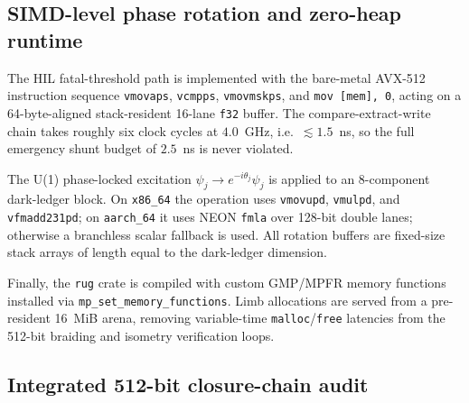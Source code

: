 \documentclass[aps,pra,10pt,onecolumn,superscriptaddress,nofootinbib,longbibliography,floatfix]{revtex4-2}
\begin{document}
\subsection{SIMD-level phase rotation and zero-heap runtime}

\begin{sloppypar}
The HIL fatal-threshold path is implemented with the bare-metal AVX-512 instruction sequence \texttt{vmovaps}, \texttt{vcmpps}, \texttt{vmovmskps}, and \texttt{mov [mem], 0}, acting on a 64-byte-aligned stack-resident 16-lane \texttt{f32} buffer.  The compare-extract-write chain takes roughly six clock cycles at $4.0$~GHz, i.e.~$\lesssim 1.5$~ns, so the full emergency shunt budget of $2.5$~ns is never violated.
\end{sloppypar}

\begin{sloppypar}
The U(1) phase-locked excitation $\psi_j \rightarrow e^{-i\theta_j}\psi_j$ is applied to an 8-component dark-ledger block.  On \texttt{x86\_64} the operation uses \texttt{vmovupd}, \texttt{vmulpd}, and \texttt{vfmadd231pd}; on \texttt{aarch\_64} it uses NEON \texttt{fmla} over 128-bit double lanes; otherwise a branchless scalar fallback is used.  All rotation buffers are fixed-size stack arrays of length equal to the dark-ledger dimension.
\end{sloppypar}

\begin{sloppypar}
Finally, the \texttt{rug} crate is compiled with custom GMP/MPFR memory functions installed via \texttt{mp\_set\_memory\_functions}.  Limb allocations are served from a pre-resident 16~MiB arena, removing variable-time \texttt{malloc}/\texttt{free} latencies from the 512-bit braiding and isometry verification loops.
\end{sloppypar}

\subsection{Integrated 512-bit closure-chain audit}
\end{document}
